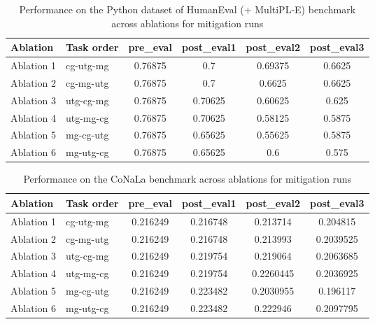 \begin{table}[!ht]
    \centering
    \caption{Performance on the Python dataset of HumanEval (+ MultiPL-E) benchmark across ablations for mitigation runs}
    \begin{tabular}{|l|l|S[table-format=2.4]|S[table-format=2.4]|S[table-format=2.4]|S[table-format=2.4]|}
    \hline
        \textbf{Ablation} & \textbf{Task order} & \textbf{pre\_eval} & \textbf{post\_eval1} & \textbf{post\_eval2} & \textbf{post\_eval3 } \\ \hline
        Ablation 1 & cg-utg-mg & 0.76875 & 0.7 & 0.69375 & 0.6625  \\ 
        Ablation 2 & cg-mg-utg & 0.76875 & 0.7 & 0.6625 & 0.6625  \\ 
        Ablation 3 & utg-cg-mg & 0.76875 & 0.70625 & 0.60625 & 0.625  \\ 
        Ablation 4 & utg-mg-cg & 0.76875 & 0.70625 & 0.58125 & 0.5875  \\ 
        Ablation 5 & mg-cg-utg & 0.76875 & 0.65625 & 0.55625 & 0.5875  \\ 
        Ablation 6 & mg-utg-cg & 0.76875 & 0.65625 & 0.6 & 0.575 \\ \hline
    \end{tabular}
    \label{tab:PythonMitigation}
\end{table}

\begin{table}[!ht]
    \centering
    \caption{Performance on the CoNaLa benchmark across ablations for mitigation runs}
    \begin{tabular}{|l|l|S[table-format=2.4]|S[table-format=2.4]|S[table-format=2.4]|S[table-format=2.4]|}
    \hline
        \textbf{Ablation} & \textbf{Task order} & \textbf{pre\_eval} & \textbf{post\_eval1} & \textbf{post\_eval2} & \textbf{post\_eval3 } \\ \hline
        Ablation 1 & cg-utg-mg & 0.216249 & 0.216748 & 0.213714 & 0.204815  \\ 
        Ablation 2 & cg-mg-utg & 0.216249 & 0.216748 & 0.213993 & 0.2039525  \\ 
        Ablation 3 & utg-cg-mg & 0.216249 & 0.219754 & 0.219064 & 0.2063685  \\ 
        Ablation 4 & utg-mg-cg & 0.216249 & 0.219754 & 0.2260445 & 0.2036925  \\ 
        Ablation 5 & mg-cg-utg & 0.216249 & 0.223482 & 0.2030955 & 0.196117  \\ 
        Ablation 6 & mg-utg-cg & 0.216249 & 0.223482 & 0.222946 & 0.2097795 \\ \hline
    \end{tabular}
    \label{tab:ConalaMitigation}
\end{table}


